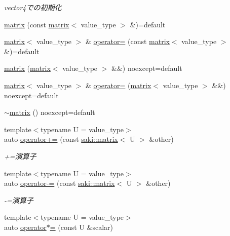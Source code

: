 \begin{DoxyCompactItemize}
\begin{DoxyCompactList}\small\item\em vector4での初期化 \end{DoxyCompactList}\item 
\mbox{\hyperlink{classsaki_1_1matrix_ad17aa0026d1a795166d6654b1df702c3}{matrix}} (const \mbox{\hyperlink{classsaki_1_1matrix}{matrix}}$<$ value\+\_\+type $>$ \&)=default
\item 
\mbox{\hyperlink{classsaki_1_1matrix}{matrix}}$<$ value\+\_\+type $>$ \& \mbox{\hyperlink{classsaki_1_1matrix_a38c5f7e666e3888d90b1c4017219f53f}{operator=}} (const \mbox{\hyperlink{classsaki_1_1matrix}{matrix}}$<$ value\+\_\+type $>$ \&)=default
\item 
\mbox{\hyperlink{classsaki_1_1matrix_a16b927b776bc7454ebbf984b7f93c23e}{matrix}} (\mbox{\hyperlink{classsaki_1_1matrix}{matrix}}$<$ value\+\_\+type $>$ \&\&) noexcept=default
\item 
\mbox{\hyperlink{classsaki_1_1matrix}{matrix}}$<$ value\+\_\+type $>$ \& \mbox{\hyperlink{classsaki_1_1matrix_a06a7330daf074554dada53978e3ccd55}{operator=}} (\mbox{\hyperlink{classsaki_1_1matrix}{matrix}}$<$ value\+\_\+type $>$ \&\&) noexcept=default
\item 
\mbox{\hyperlink{classsaki_1_1matrix_a6fe9a4d52c93051ecdb1075abe5a272b}{$\sim$matrix}} () noexcept=default
\item 
{\footnotesize template$<$typename U  = value\+\_\+type$>$ }\\auto \mbox{\hyperlink{classsaki_1_1matrix_ad004cb2830b0c22778b99b57fcbde8df}{operator+=}} (const \mbox{\hyperlink{classsaki_1_1matrix}{saki\+::matrix}}$<$ U $>$ \&other)
\begin{DoxyCompactList}\small\item\em +=演算子 \end{DoxyCompactList}\item 
{\footnotesize template$<$typename U  = value\+\_\+type$>$ }\\auto \mbox{\hyperlink{classsaki_1_1matrix_ae7c736de15ce97ad5d41193beeecf18d}{operator-\/=}} (const \mbox{\hyperlink{classsaki_1_1matrix}{saki\+::matrix}}$<$ U $>$ \&other)
\begin{DoxyCompactList}\small\item\em -\/=演算子 \end{DoxyCompactList}\item 
{\footnotesize template$<$typename U  = value\+\_\+type$>$ }\\auto \mbox{\hyperlink{classsaki_1_1matrix_ade74f7e19240123da31171ca469246e7}{operator$\ast$=}} (const U \&scalar)

\end{DoxyCompactItemize}
